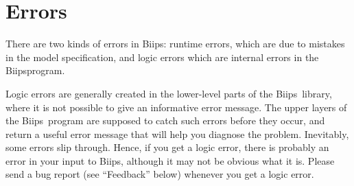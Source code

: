 \documentclass[11pt, a4paper, titlepage]{report}
\newcommand{\biips}{\textsf{Biips}}
\begin{document}
% 
% 
% 
% 

\section{Errors}

There are two kinds of errors in \biips: runtime errors, which are due to
mistakes in the model specification, and logic errors which are internal
errors in the \biips program. 

Logic errors are generally created in the lower-level parts of the \biips\
library, where it is not possible to give an informative error message.
The upper layers of the \biips\ program are supposed to catch such errors
before they occur, and return a useful error message that will help you
diagnose the problem.  Inevitably, some errors slip through. Hence,
if you get a logic error, there is probably an error in your input to
\biips, although it may not be obvious what it is. Please send a bug
report (see ``Feedback'' below) whenever you get a logic error.
\end{document}
